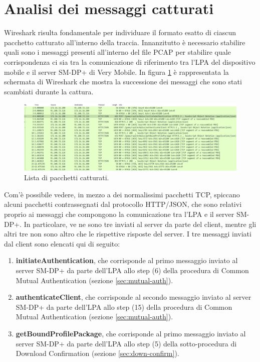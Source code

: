 \documentclass[10pt, oneside]{book}
\begin{document}
\section{Analisi dei messaggi catturati}
Wireshark risulta fondamentale per individuare il formato esatto di ciascun pacchetto catturato all'interno della traccia. Innanzitutto è necessario stabilire quali sono i messaggi presenti all'interno del file PCAP per stabilire quale corrispondenza ci sia tra la comunicazione di riferimento tra l'LPA del dispositivo mobile e il server SM-DP+ di Very Mobile. In figura \ref{fig:all-msgs-pcap} è rappresentata la schermata di Wireshark che mostra la successione dei messaggi che sono stati scambiati durante la cattura.\\
\begin{figure}
\includegraphics[width=\linewidth]{all-msgs-pcap.png}
\caption{Lista di pacchetti catturati.}
\label{fig:all-msgs-pcap}
\end{figure}
Com'è possibile vedere, in mezzo a dei normalissimi pacchetti TCP, spiccano alcuni pacchetti contrassegnati dal protocollo HTTP/JSON, che sono relativi proprio ai messaggi che compongono la comunicazione tra l'LPA e il server SM-DP+. In particolare, ve ne sono tre inviati al server da parte del client, mentre gli altri tre non sono altro che le rispettive risposte del server. I tre messaggi inviati dal client sono elencati qui di seguito:
\begin{enumerate}
\item \textbf{initiateAuthentication}, che corrisponde al primo messaggio inviato al server SM-DP+ da parte dell'LPA allo step (6) della procedura di Common Mutual Authentication (sezione \ref{sec:mutual-auth}).
\item \textbf{authenticateClient}, che corrisponde al secondo messaggio inviato al server SM-DP+ da parte dell'LPA allo step (15) della procedura di Common Mutual Authentication (sezione \ref{sec:mutual-auth}).
\item \textbf{getBoundProfilePackage}, che corrisponde al primo messaggio inviato al server SM-DP+ da parte dell'LPA allo step (5) della sotto-procedura di Download Confirmation (sezione \ref{sec:down-confirm}).
\end{enumerate}
\end{document}
